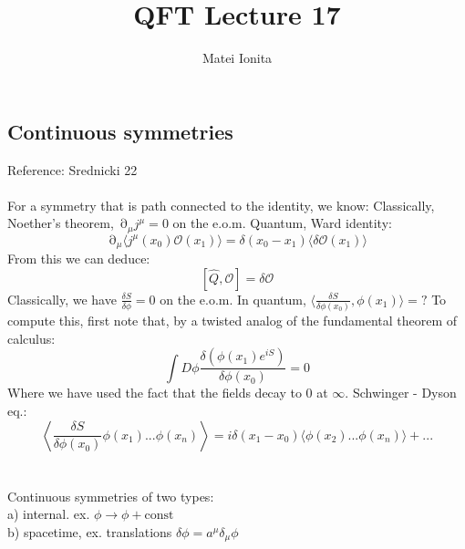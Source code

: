 \documentclass[12 pt]{article}
\title{QFT Lecture 17}
\author{Matei Ionita}
\DeclareMathOperator {\p} {\partial}
\begin{document}
  \maketitle

\subsection*{Continuous symmetries}
Reference: Srednicki 22
\\
\\
For a symmetry that is path connected to the identity, we know: Classically, Noether's theorem, $\p_{\mu} j^{\mu} = 0$ on the e.o.m. Quantum, Ward identity:
\[     \p_{\mu} \langle j^{\mu}(x_0) \mathcal{O}(x_1)\rangle   = \delta(x_0 - x_1) \langle \delta \mathcal{O} (x_1)\rangle   \]
From this we can deduce:
\[   [ \hat Q , \mathcal{O} ] = \delta \mathcal{O}   \]
Classically, we have $\frac{\delta S}{\delta \phi} = 0$ on the e.o.m. In quantum, $\langle \frac{\delta S}{\delta \phi (x_0)} , \phi(x_1) \rangle = ?$ To compute this, first note that, by a twisted analog of the fundamental theorem of calculus:
\[       \int D\phi \frac{\delta (\phi(x_1) e^{iS})}{\delta \phi(x_0) }   = 0    \]
Where we have used the fact that the fields decay to 0 at $\infty$. Schwinger - Dyson eq.:
\[        \left\langle  \frac{\delta S}{\delta \phi (x_0)} \phi(x_1) ... \phi(x_n) \right\rangle   = i \delta (x_1 - x_0) \langle \phi (x_2) ... \phi (x_n) \rangle +...     \]
\\
\\
Continuous symmetries of two types:
\\
a) internal. ex. $\phi \to \phi + \text{const}$
\\
b) spacetime, ex. translations $\delta \phi = a^{\mu} \delta_{\mu} \phi$
\end{document}
